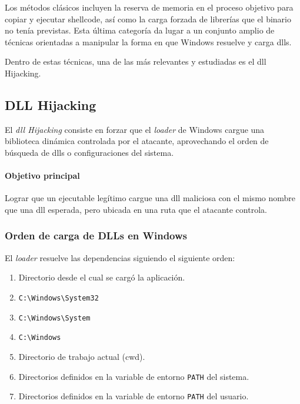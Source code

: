 Los métodos clásicos incluyen la reserva de memoria en el proceso objetivo para copiar y ejecutar shellcode, así como la carga forzada de librerías que el binario no tenía previstas. Esta última categoría da lugar a un conjunto amplio de técnicas orientadas a manipular la forma en que Windows resuelve y carga \acrshort{dll}s.

Dentro de estas técnicas, una de las más relevantes y estudiadas es el \acrshort{dll} Hijacking. 

\subsection{DLL Hijacking}

El \textit{\acrshort{dll} Hijacking} consiste en forzar que el \textit{loader} de Windows cargue una biblioteca dinámica controlada por el atacante, aprovechando el orden de búsqueda de \acrshort{dll}s o configuraciones del sistema.

\paragraph{Objetivo principal}  
Lograr que un ejecutable legítimo cargue una \acrshort{dll} maliciosa con el mismo nombre que una \acrshort{dll} esperada, pero ubicada en una ruta que el atacante controla.

\subsubsection{Orden de carga de DLLs en Windows}

El \textit{loader} resuelve las dependencias siguiendo el siguiente orden:

\begin{enumerate}
    \item Directorio desde el cual se cargó la aplicación.
    \item \texttt{C:\textbackslash Windows\textbackslash System32}
    \item \texttt{C:\textbackslash Windows\textbackslash System}
    \item \texttt{C:\textbackslash Windows}
    \item Directorio de trabajo actual (\acrshort{cwd}).
    \item Directorios definidos en la variable de entorno \texttt{PATH} del sistema.
    \item Directorios definidos en la variable de entorno \texttt{PATH} del usuario.
\end{enumerate}

